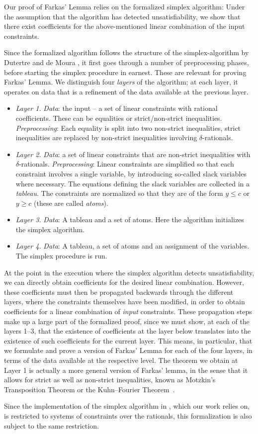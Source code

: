 \documentclass[11pt,a4paper]{article}
\begin{document}
Our proof of Farkas' Lemma \cite[Cor.~7.1e]{LinearProgramming} relies on the formalized simplex algorithm: Under the assumption that the algorithm has detected
unsatisfiability, we show that there exist coefficients for the above-mentioned linear combination of the input constraints.

Since the formalized algorithm follows the structure of the simplex-algorithm 
by Dutertre and de Moura \cite{simplex-rad}, it first goes through a number of
preprocessing phases, before starting the simplex procedure in earnest. These are relevant for proving Farkas' Lemma.
We distinguish four \emph{layers} of the algorithm; at each layer, it operates on data that is a refinement of the data available at the previous layer.

\begin{itemize}
\item \emph{Layer 1.} \emph{Data}: the input -- a set of linear constraints with rational coefficients. These can be equalities or strict/non-strict
inequalities. \emph{Preprocessing}: Each equality is split into two non-strict inequalities, strict inequalities are replaced
by non-strict inequalities involving $\delta$-rationals.
\item \emph{Layer 2.} \emph{Data}: a set of linear constraints that are non-strict inequalities with $\delta$-rationals. \emph{Preprocessing}:
Linear constraints are simplified so that each constraint involves a single variable, by introducing so-called slack variables where necessary.
The equations defining the slack variables are collected in a \emph{tableau}. The constraints are normalized so that they are of the form
$y\leq c$ or $y\geq c$ (these are called \emph{atoms}).
\item \emph{Layer 3.} \emph{Data}: A tableau and a set of atoms. Here the algorithm initializes the simplex algorithm.
\item \emph{Layer 4.} \emph{Data}: A tableau, a set of atoms and an assignment of the variables. The simplex procedure is run.
\end{itemize}

At the point in the execution where the simplex algorithm detects unsatisfiability, we can directly obtain
coefficients for the desired linear combination. However, these coefficients must then be propagated backwards through the different
layers, where the constraints themselves have been modified, in order to obtain coefficients for a linear combination of \emph{input}
constraints. These propagation steps make up a large part of the formalized proof, since we must show, at each of the layers 1--3,
that the existence of coefficients at the layer below translates into the existence of such
coefficients for the current layer. This means, in particular, that we formulate and prove a version of Farkas' Lemma for each of the four
layers, in terms of the data available at the respective level. The theorem we obtain at Layer 1 is actually a more general version of
Farkas' lemma, in the sense that it allows for strict as well as non-strict inequalities, known as Motzkin's Transposition Theorem \cite[Cor.~7.1k]{LinearProgramming} or 
the Kuhn--Fourier Theorem~\cite[Thm.~1.1.9]{StoerWitzgall}.

Since the implementation of the simplex algorithm in \cite{simplex-afp}, which our work relies on, is restricted to systems of constraints over the rationals, this formalization is
also subject to the same restriction.






\end{document}
